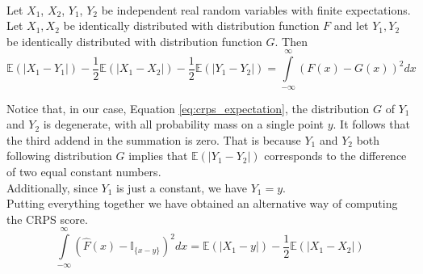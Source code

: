 \\
\begin{lemma}
    Let $X_1$, $X_2$, $Y_1$, $Y_2$ be independent real random variables with finite expectations. Let $X_1,X_2$ be identically distributed with distribution function $F$ and let $Y_1,Y_2$ be identically distributed with distribution function $G$. Then
   \begin{equation}\label{eq:crps_expectation}
    \mathbb{E}(|X_1-Y_1|)-\frac{1}{2}\mathbb{E}(|X_1-X_2|)-\frac{1}{2}\mathbb{E}(|Y_1-Y_2|)=\int\limits_{-\infty}^{\infty}\left(F(x)-G(x)\right)^2dx
\end{equation}
\end{lemma}
Notice that, in our case, Equation \ref{eq:crps_expectation}, the distribution $G$ of $Y_1$ and $Y_2$ is degenerate, with all probability mass on a single point $y$.
It follows that the third addend in the summation is zero. That is because $Y_1$ and $Y_2$ both following distribution $G$ implies that $\mathbb{E}(|Y_1-Y_2|)$ corresponds to the difference of two equal constant numbers.
\\
Additionally, since $Y_1$ is just a constant, we have $Y_1=y$.
\\
Putting everything together we have obtained an alternative way of computing the CRPS score.
\begin{equation}
    \int\limits_{-\infty}^{\infty}\left(\hat{F}(x)-\mathbb{I}_{\{x-y\}} \right)^2 dx=\mathbb{E}(|X_1-y|)-\frac{1}{2}\mathbb{E}(|X_1-X_2|)
\end{equation}
\\
